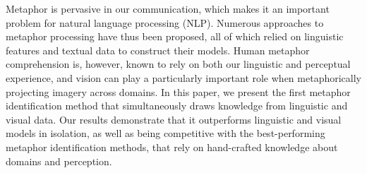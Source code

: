 Metaphor is pervasive in our communication, which makes it an important problem for natural language processing (NLP). Numerous approaches to metaphor processing have thus been proposed, all of which relied on linguistic features and textual data to construct their models. Human metaphor comprehension is, however, known to rely on both our linguistic and perceptual experience, and vision can play a particularly important role when metaphorically projecting imagery across domains. In this paper, we present the first metaphor identification method that simultaneously draws knowledge from linguistic and visual data. Our results demonstrate that it outperforms linguistic and visual models in isolation, as well as being competitive with the best-performing metaphor identification methods, that rely on hand-crafted knowledge about domains and perception.

